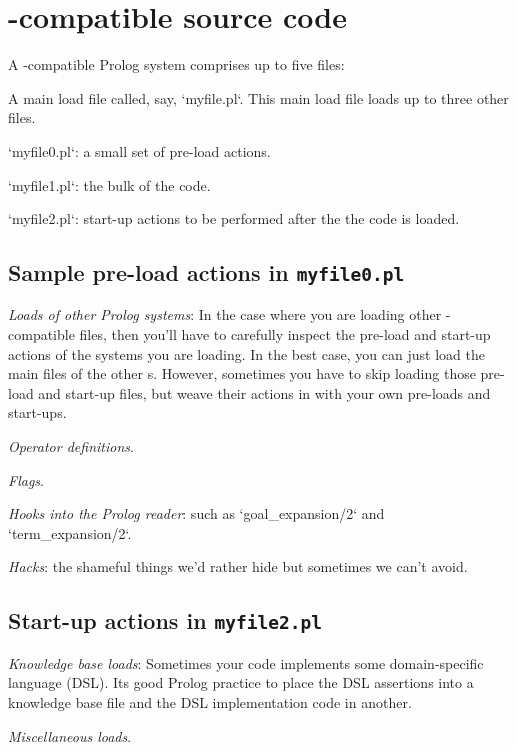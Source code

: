 \section{{\PROD}-compatible source code}
A {\PROD}-compatible Prolog system comprises up to five files:

\be
\item A main load file called, say, `myfile.pl`.
This main load file loads up to three other files.
\item `myfile0.pl`: a small set of pre-load actions.
\item `myfile1.pl`: the bulk of the code.
\item `myfile2.pl`: start-up actions to be performed after
the the code is loaded.
\ee

\subsection{Sample pre-load actions in {\tt myfile0.pl}}

\bi
\item{\em Loads of other Prolog systems}: In the case where you
are loading other {\PROD}-compatible  files, then  you'll have to
carefully inspect the pre-load and start-up actions
of the systems you are loading. In the best case, you can
just load the main files of the other {\PROD}s. However,
sometimes you have to skip loading those pre-load and start-up
files, but weave their actions in with your own
pre-loads and start-ups.
\item
{\em Operator definitions}.
\item
{\em Flags}.
\item
{\em Hooks into the Prolog reader}: such as `goal_expansion/2` and
`term_expansion/2`.
\item
{\em Hacks}: the shameful things we'd rather hide but sometimes we can't avoid.
\ei

\subsection{Start-up actions in {\tt myfile2.pl}}

\bi
\item
{\em Knowledge base loads}:  Sometimes your code implements some
domain-specific language (DSL). Its good Prolog practice to
place the DSL assertions into a knowledge base file and the DSL
implementation code in another.
\item {\em Miscellaneous loads}.
\ei
